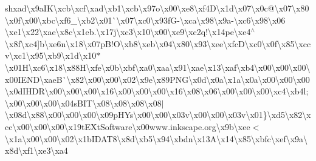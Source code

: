\begin{DoxyCompactItemize}
sh{}xad\textbackslash{}x9a\+I\+K\textbackslash{}xcb\textbackslash{}xcf\textbackslash{}xad\textbackslash{}xb1\textbackslash{}xcb\textbackslash{}x97o\textbackslash{}x00\textbackslash{}xe8\textbackslash{}xf4\+D\textbackslash{}x1d\textbackslash{}x07\textbackslash{}x0c@\textbackslash{}x07\textbackslash{}x80\textbackslash{}x0f\textbackslash{}x00\textbackslash{}xbc\textbackslash{}xf6\+\_\+\textbackslash{}xb2\textbackslash{}x01\`{}\textbackslash{}x07\textbackslash{}xc0\textbackslash{}x93f\+G-\/\textbackslash{}xca\textbackslash{}x98\textbackslash{}x9a-\/\textbackslash{}xc6\textbackslash{}x98\textbackslash{}x06 \textbackslash{}xe1\textbackslash{}x22\textbackslash{}xae\textbackslash{}x8c\textbackslash{}x1eb.\textbackslash{}x17j\textbackslash{}xc3\textbackslash{}x10\textbackslash{}x00\textbackslash{}xe9\textbackslash{}xc2q!\textbackslash{}x14pe\textbackslash{}xe4$^\wedge$\textbackslash{}x8f\textbackslash{}xc4\mbox{]}b\textbackslash{}xe6n\textbackslash{}x18\textbackslash{}x07p\+B!\+O\textbackslash{}xb8\textbackslash{}xeb\textbackslash{}x04\textbackslash{}x80\textbackslash{}x93\textbackslash{}xee\textbackslash{}xfc\+D\textbackslash{}xc0\textbackslash{}x0f\textbackslash{}x85\textbackslash{}xccv\textbackslash{}xc1\textbackslash{}x95\textbackslash{}xb9\textbackslash{}x1d\textbackslash{}x10$\ast$\textbackslash{}x01\+H\textbackslash{}xc6\textbackslash{}x18\textbackslash{}x88\+H\textbackslash{}xfe\textbackslash{}x0b\textbackslash{}xbf\textbackslash{}xa0\textbackslash{}xaa\textbackslash{}x91\textbackslash{}xae\textbackslash{}x13\textbackslash{}xaf\textbackslash{}xb4\textbackslash{}x00\textbackslash{}x00\textbackslash{}x00\textbackslash{}x00\+I\+E\+N\+D\textbackslash{}xae\+B\`{}\textbackslash{}x82\textbackslash{}x00\textbackslash{}x00\textbackslash{}x02\textbackslash{}x9e\textbackslash{}x89\+P\+N\+G\textbackslash{}x0d\textbackslash{}x0a\textbackslash{}x1a\textbackslash{}x0a\textbackslash{}x00\textbackslash{}x00\textbackslash{}x00\textbackslash{}x0d\+I\+H\+D\+R\textbackslash{}x00\textbackslash{}x00\textbackslash{}x00\textbackslash{}x16\textbackslash{}x00\textbackslash{}x00\textbackslash{}x00\textbackslash{}x16\textbackslash{}x08\textbackslash{}x06\textbackslash{}x00\textbackslash{}x00\textbackslash{}x00\textbackslash{}xc4\textbackslash{}xb4l;\textbackslash{}x00\textbackslash{}x00\textbackslash{}x00\textbackslash{}x04s\+B\+I\+T\textbackslash{}x08\textbackslash{}x08\textbackslash{}x08\textbackslash{}x08$\vert$\textbackslash{}x08d\textbackslash{}x88\textbackslash{}x00\textbackslash{}x00\textbackslash{}x00\textbackslash{}x09p\+H\+Ys\textbackslash{}x00\textbackslash{}x00\textbackslash{}x03v\textbackslash{}x00\textbackslash{}x00\textbackslash{}x03v\textbackslash{}x01\}\textbackslash{}xd5\textbackslash{}x82\textbackslash{}xcc\textbackslash{}x00\textbackslash{}x00\textbackslash{}x00\textbackslash{}x19t\+E\+Xt\+Software\textbackslash{}x00www.\+inkscape.\+org\textbackslash{}x9b\textbackslash{}xee$<$\textbackslash{}x1a\textbackslash{}x00\textbackslash{}x00\textbackslash{}x02\textbackslash{}x1b\+I\+D\+A\+T8\textbackslash{}x8d\textbackslash{}xb5\textbackslash{}x94\textbackslash{}xbdn\textbackslash{}x13\+A\textbackslash{}x14\textbackslash{}x85\textbackslash{}xbfc\textbackslash{}xef\textbackslash{}x9a\textbackslash{}x8d\textbackslash{}xf1\textbackslash{}xe3\textbackslash{}xa4\textbac
\end{DoxyCompactItemize}
